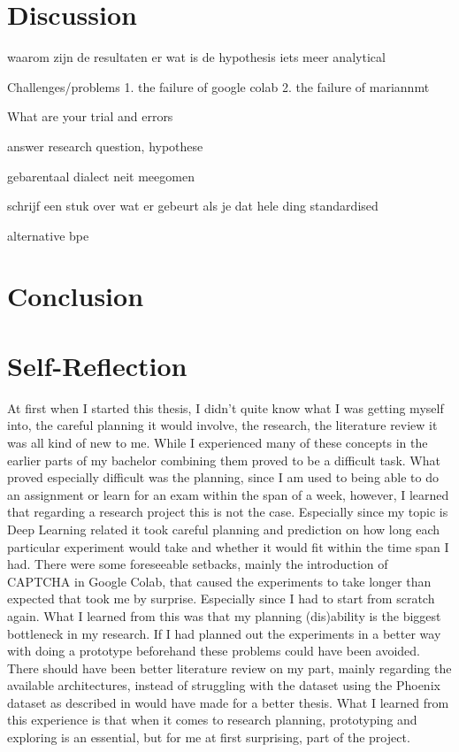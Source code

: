 \section{Discussion}
waarom zijn de resultaten er wat is de hypothesis iets meer analytical

Challenges/problems
1. the failure of google colab
2. the failure of mariannmt

What are your trial and errors

answer research question, hypothese

gebarentaal dialect neit meegomen

schrijf een stuk over wat er gebeurt als je dat hele ding standardised

alternative bpe




\section{Conclusion}

\section{Self-Reflection}

At first when I started this thesis, I didn't quite know what I was getting myself into, the careful planning it would involve, the research, the literature review it was all kind of new to me. While I experienced many of these concepts in the earlier parts of my bachelor combining them proved to be a difficult task. What proved especially difficult was the planning, since I am used to being able to do an assignment or learn for an exam within the span of a week, however, I learned that regarding a research project this is not the case. Especially since my topic is Deep Learning related it took careful planning and prediction on how long each particular experiment would take and whether it would fit within the time span I had. There were some foreseeable setbacks, mainly the introduction of CAPTCHA in Google Colab, that caused the experiments to take longer than expected that took me by surprise. Especially since I had to start from scratch again. What I learned from this was that my planning (dis)ability is the biggest bottleneck in my research. If I had planned out the experiments in a better way with doing a prototype beforehand these problems could have been avoided. There should have been better literature review on my part, mainly regarding the available architectures, instead of struggling with the dataset using the Phoenix dataset as described in \cite{camgoz2018neural} would have made for a better thesis. What I learned from this experience is that when it comes to research planning, prototyping and exploring is an essential, but for me at first surprising, part of the project.

